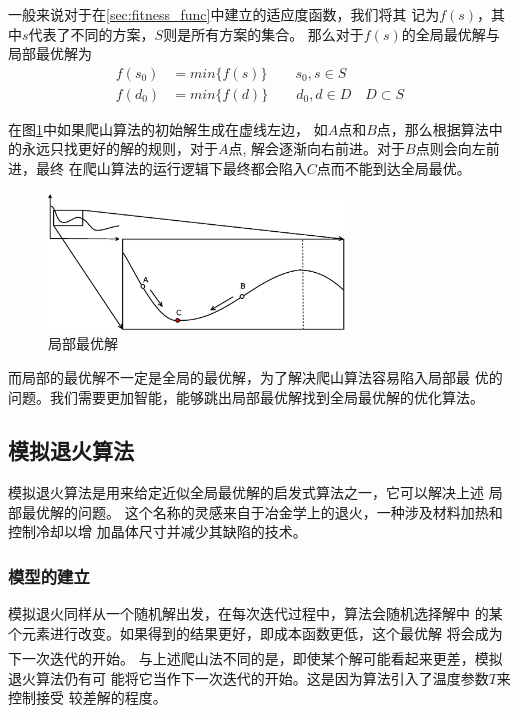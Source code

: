 \documentclass[fontset=fandol,a4paper,zihao=5]{ctexart}
\newcommand{\upcite}[1]{\textsuperscript{\textsuperscript{\cite{#1}}}}
\begin{document}
            一般来说对于在\ref{sec:fitness_func}中建立的适应度函数，我们将其
            记为$f(s)$，其中$s$代表了不同的方案，$S$则是所有方案的集合。
            那么对于$f(s)$的全局最优解与局部最优解为
            \begin{align}
                f(s_0) &= min\{f(s)\} \qquad s_0,s \in S \\
                f(d_0) &= min\{f(d)\} \qquad d_0,d \in D \quad D \subset S
            \end{align}

            在图\ref{fig:local_best}中如果爬山算法的初始解生成在虚线左边，
            如$A$点和$B$点，那么根据算法中的永远只找更好的解的规则，对于$A$点,
            解会逐渐向右前进。对于$B$点则会向左前进，最终
            在爬山算法的运行逻辑下最终都会陷入$C$点而不能到达全局最优。
            
			\begin{figure}[!htbp]
				\centering
				\includegraphics[width=0.7\textwidth]{pic/local_best.eps}
				\caption{\label{fig:local_best}局部最优解}
			\end{figure}

			而局部的最优解不一定是全局的最优解，为了解决爬山算法容易陷入局部最
            优的问题。我们需要更加智能，能够跳出局部最优解找到全局最优解的优化算法。
		\subsection{模拟退火算法}
			模拟退火算法是用来给定近似全局最优解的启发式算法之一，它可以解决上述
            局部最优解的问题。
			这个名称的灵感来自于冶金学上的退火，一种涉及材料加热和控制冷却以增
            加晶体尺寸并减少其缺陷的技术。
			
			\subsubsection{模型的建立}
			模拟退火同样从一个随机解出发，在每次迭代过程中，算法会随机选择解中
            的某个元素进行改变。如果得到的结果更好，即成本函数更低，这个最优解
            将会成为下一次迭代的开始\upcite{王雪梅1997模拟退火算法与遗传算法的结合}。
			与上述爬山法不同的是，即使某个解可能看起来更差，模拟退火算法仍有可
            能将它当作下一次迭代的开始。这是因为算法引入了温度参数$T$来控制接受
            较差解的程度。
			
\end{document}
